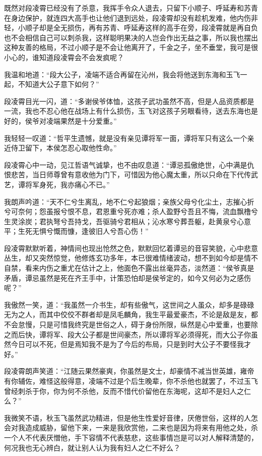 既然对段凌霄已经没有了杀意，我挥手令众人退去，只留下小顺子、呼延寿和苏青在身边保护，就连四大高手也让他们退到远处，段凌霄却没有趁机发难，他内伤非轻，小顺子却是全无损伤，再有苏青、呼延寿这样的高手在旁，段凌霄就是再自负也不会相信自己可以刺杀我，这样聪明果决的人岂会作出无益之事，所以我也摆出这种友善的格局，不过小顺子是不会让他离开了，千金之子，坐不垂堂，我可是很小心的，谁知道段凌霄会不会发疯呢？

我温和地道：“段大公子，凌端不适合再留在沁州，我会将他送到东海和玉飞一起，不知道大公子意下如何？”

段凌霄目光一闪，道：“多谢侯爷体恤，这孩子武功虽然不高，但是人品资质都是一流，我也不忍心他在战场上有什么损伤，玉飞对这孩子另眼看待，送去东海也是好的，侯爷对凌端果然是十分爱重。”

我轻轻一叹道：“哲平生遗憾，就是没有亲见谭将军一面，谭将军只有这么一个亲近侍卫留下，本侯怎忍心取他性命。”

段凌霄心中一动，见江哲语气诚挚，也不由叹息道：“谭忌孤傲绝世，心中满是仇恨悲苦，当日师尊曾有意收他为门下，可惜因为他心魔太重，所以只命在下代传武艺，谭将军身死，我亦痛心不已。”

我朗声吟道：“天不仁兮生离乱，地不仁兮起狼烟；亲族父母兮化尘土，志摧心折兮可奈何；怨虽报兮恨不息，君恩重兮死亦难；杀人盈野兮吾且不悔，流血飘橹兮生灵涂炭；君执弩兮吾持戈，吾驱骑兮君相从；沁水寒兮葬吾躯，赴黄泉兮心意平；生死无惧兮慨而慷，逢彼旧人兮吾心伤！”

段凌霄默默听着，神情间也现出怆然之色，默默回忆着谭忌的音容笑貌，心中悲意丛生，却又突然惊觉，他修炼玄功多年，本已很难情绪波动，想不到如今却是情不自禁，看来内伤之重尤在估计之上，他面色不露出丝毫异态，淡然道：“侯爷真是矛盾，谭忌虽然是死在齐王手中，计策恐怕却是侯爷定的，如今又何必为之感伤呢？”

我傲然一笑，道：“我虽然一介书生，却有些傲气，这世间之人虽众，却多是碌碌无为之人，而其中佼佼不群者却是凤毛麟角，我生平最爱豪杰，不论是敌是友，都不会怠慢，只是可惜我终究是世俗之人，碍于身份所限，纵然是心中爱重，也要除之而后快，谭将军、段大公子都是世间豪杰，所以谭将军必须得死，而大公子你虽然今日可以不死，但是焉知我不是为了今后的布局，只是到时大公子不要怪我才好。”

段凌霄朗声笑道：“江随云果然豪爽，你虽然是文士，却豪情不减当世英雄，雍帝有你辅佐，难怪这般得意，凌端不过是个后生晚辈，你不杀他也就罢了，不过玉飞曾经刺杀于你，你为何不杀他，反而不惜代价留他在东海呢，这却不是妇人之仁么？”

我微笑不语，秋玉飞虽然武功精进，但是他生性爱好音律，厌倦世俗，这样的人怎会对我造成威胁，留他下来，一来是我欣赏他，二来也是因为将来有用他之处，杀一个人不代表厌憎他，手下容情不代表慈悲，这些事情岂是可以对人解释清楚的，何况我也无心辨白，就让别人认为我有妇人之仁不好么？

